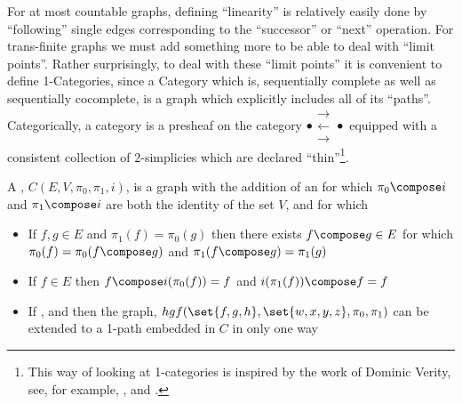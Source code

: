 \documentclass[a4paper,openany]{amsart}
\begin{document}
For at most countable graphs, defining ``linearity'' is relatively easily done by
``following'' single edges corresponding to the ``successor'' or ``next'' operation. For
trans-finite graphs we must add something more to be able to deal with ``limit points''.
Rather surprisingly, to deal with these ``limit points'' it is convenient to define
1-Categories, since a Category which is, sequentially complete as well as sequentially
cocomplete, is a graph which explicitly includes all of its ``paths''. Categorically, a
category is a presheaf on the category
$ \bullet \substack{\mathbf{\longrightarrow} \\[-0.7ex] \mathbf{\longleftarrow} 
\\[-0.7ex] \mathbf{\longrightarrow} } \bullet $
equipped with a consistent collection of 2-simplicies which are declared
``thin''\footnote{This way of looking at 1-categories is inspired by the work of Dominic
Verity, see, for example, \cite{verity2005complicialSets},
\cite{verity2006complicialSimplicialHomotopy} and
\cite{verity2006simplicialComplicialCategories}.}.

\begin{definition}

A , $C(E, V, \pi_0, \pi_1, i)$, is a graph with the addition of an 
  for which $\pi_0 \compose i$ and $\pi_1 
\compose i$ are both the identity of the set $V$, and for which 

\begin{itemize}

\item If $f, g \in E$ and $\pi_1(f) = \pi_0(g)$ then there exists $f \compose g \in E$ for 
which $ \pi_0(f) = \pi_0(f \compose g)$ and $ \pi_1(f \compose g) = \pi_1(g)$

\item If $f \in E$ then $ f \compose i(\pi_0(f)) = f$ and $i(\pi_1(f)) \compose f = f$

\item If ,  and  then the graph, $hgf(\set{f,
g, h}, \set{w, x, y, z}, \pi_0, \pi_1)$ can be extended to a 1-path embedded in $C$ in only 
one way

\end{itemize}

\end{definition}
\end{document}
